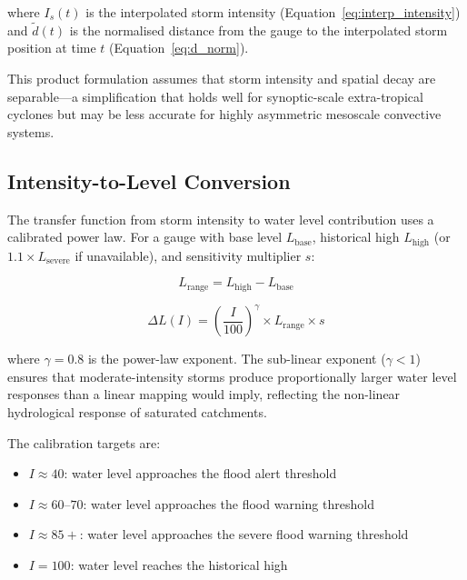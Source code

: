 \documentclass[11pt,a4paper]{article}
\begin{document}
\noindent where $I_s(t)$ is the interpolated storm intensity
(Equation~\ref{eq:interp_intensity}) and $\tilde{d}(t)$ is the normalised
distance from the gauge to the interpolated storm position at time $t$
(Equation~\ref{eq:d_norm}).

This product formulation assumes that storm intensity and spatial decay are
separable---a simplification that holds well for synoptic-scale extra-tropical
cyclones but may be less accurate for highly asymmetric mesoscale convective
systems.

\subsection{Intensity-to-Level Conversion}
\label{sec:intensity_to_level}

The transfer function from storm intensity to water level contribution uses a
calibrated power law. For a gauge with base level $L_{\text{base}}$, historical
high $L_{\text{high}}$ (or $1.1 \times L_{\text{severe}}$ if unavailable),
and sensitivity multiplier $s$:

\begin{equation}
    L_{\text{range}} = L_{\text{high}} - L_{\text{base}}
    \label{eq:level_range}
\end{equation}

\begin{equation}
    \Delta L(I) = \left(\frac{I}{100}\right)^{\!\gamma} \times L_{\text{range}} \times s
    \label{eq:power_law}
\end{equation}

\noindent where $\gamma = 0.8$ is the power-law exponent. The sub-linear
exponent ($\gamma < 1$) ensures that moderate-intensity storms produce
proportionally larger water level responses than a linear mapping would imply,
reflecting the non-linear hydrological response of saturated catchments.

The calibration targets are:
\begin{itemize}[nosep]
    \item $I \approx 40$: water level approaches the flood alert threshold
    \item $I \approx 60$--$70$: water level approaches the flood warning threshold
    \item $I \approx 85+$: water level approaches the severe flood warning threshold
    \item $I = 100$: water level reaches the historical high
\end{itemize}
\end{document}
